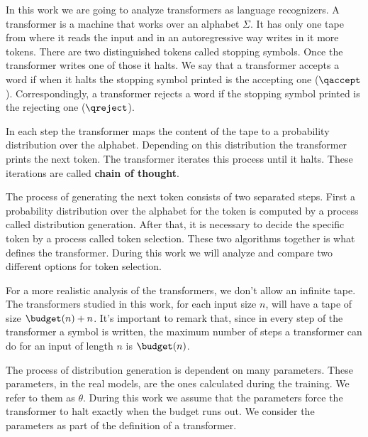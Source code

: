 

In this work we are going to analyze transformers as language recognizers.
A transformer is a machine that works over an alphabet $\Sigma$.
It has only one tape from where it reads the input and in an autoregressive way writes in it more tokens.
There are two distinguished tokens called stopping symbols.
Once the transformer writes one of those it halts.
We say that a transformer accepts a word if when it halts the stopping symbol printed is the accepting one ($\qaccept$).
Correspondingly, a transformer rejects a word if the stopping symbol printed is the rejecting one ($\qreject$).

In each step the transformer maps the content of the tape to a probability distribution over the alphabet.
Depending on this distribution the transformer prints the next token.
The transformer iterates this process until it halts.
These iterations are called \textbf{chain of thought}.

The process of generating the next token consists of two separated steps.
First a probability distribution over the alphabet for the token is computed by a process called distribution generation.
After that, it is necessary to decide the specific token by a process called token selection.
These two algorithms together is what defines the transformer.
During this work we will analyze and compare two different options for token selection.

For a more realistic analysis of the transformers, we don't allow an infinite tape.
The transformers studied in this work, for each input size $n$, will have a tape of size $\budget(n) + n$.
It's important to remark that, since in every step of the transformer a symbol is written, the maximum number of steps a transformer can do for an input of length $n$ is $\budget(n)$.


The process of distribution generation is dependent on many parameters.
These parameters, in the real models, are the ones calculated during the training.
We refer to them as $\theta$.
During this work we assume that the parameters force the transformer to halt exactly when the budget runs out. 
We consider the parameters as part of the definition of a transformer.




\medskip

